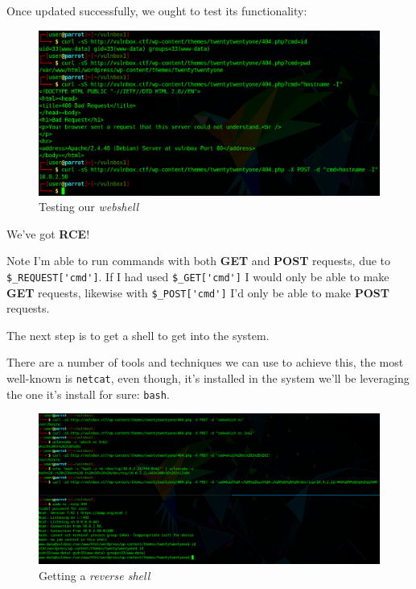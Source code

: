 \documentclass[12pt]{article}
\begin{document}
    Once updated successfully, we ought to test its functionality:

    \begin{figure}[H]\label{pic:36-curl-rce-test}
        \centering
        \includegraphics[width=1.00\textwidth]{36-curl-rce-test.png}
        \caption{Testing our \textit{webshell}}
    \end{figure}

    We've got \textbf{RCE}!

    Note I'm able to run commands with both \textbf{GET} and \textbf{POST}
    requests, due to \verb!$_REQUEST['cmd']!. If I had used \verb!$_GET['cmd']!
    I would only be able to make \textbf{GET} requests, likewise with
    \verb!$_POST['cmd']! I'd only be able to make \textbf{POST} requests.

    The next step is to get a shell to get into the system.

    There are a number of tools and techniques we can use to achieve this, the
    most well-known is \texttt{netcat}, even though, it's installed in the
    system we'll be leveraging the one it's install for sure: \texttt{bash}.

    \begin{figure}[H]\label{pic:37-reverse-shell}
        \centering
        \includegraphics[width=1.00\textwidth]{37-reverse-shell.png}
        \caption{Getting a \textit{reverse shell}}
    \end{figure}
\end{document}
